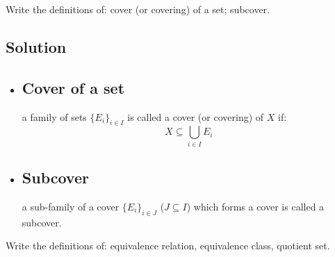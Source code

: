 
\question
Write the definitions of: cover (or covering) of a set; subcover.

\subsection*{Solution}
\provdefs
\begin{itemize}
    \item \subsection{Cover of a set} a family of sets $\{E_i\}_{i\in I}$ is called a cover (or covering) of $X$ if:
    \[
        X \subseteq \bigcup_{i\in I} E_i    
    \]
    \item \subsection{Subcover} a sub-family of a cover $\{E_i\}_{i\in J}$ ($J\subseteq I$) which forms a cover is called a subcover.  
\end{itemize}


\question
Write the definitions of: equivalence relation, equivalence class, quotient set.

